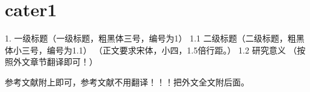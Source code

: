 
\newpage

\section{cater1}

1.	一级标题（一级标题，粗黑体三号，编号为1）
1.1 二级标题（二级标题，粗黑体小三号，编号为1.1）
（正文要求宋体，小四，1.5倍行距。）
1.2 研究意义
（按照外文章节翻译即可！）

参考文献附上即可，参考文献不用翻译！！！把外文全文附后面。
